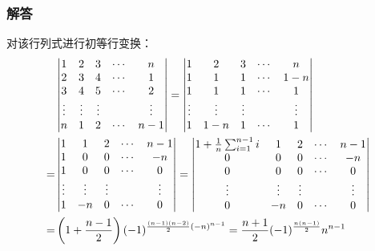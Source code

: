 \documentclass[10pt,xcolor=svgnames]{beamer} %
\begin{document}
\begin{frame}
    \frametitle{解答}
    对该行列式进行初等行变换：
    \begin{align*}
          &
        \begin{vmatrix}
            1      & 2      & 3      & \cdots & n      \\
            2      & 3      & 4      & \cdots & 1      \\
            3      & 4      & 5      & \cdots & 2      \\
            \vdots & \vdots & \vdots &        & \vdots \\
            n      & 1      & 2      & \cdots & n-1
        \end{vmatrix}=
        \begin{vmatrix}
            1      & 2      & 3      & \cdots & n      \\
            1      & 1      & 1      & \cdots & 1-n    \\
            1      & 1      & 1      & \cdots & 1      \\
            \vdots & \vdots & \vdots &        & \vdots \\
            1      & 1-n    & 1      & \cdots & 1
        \end{vmatrix}                                                                  \\
        = &
        \begin{vmatrix}
            1      & 1      & 2      & \cdots & n-1    \\
            1      & 0      & 0      & \cdots & -n     \\
            1      & 0      & 0      & \cdots & 0      \\
            \vdots & \vdots & \vdots &        & \vdots \\
            1      & -n     & 0      & \cdots & 0
        \end{vmatrix}=
        \begin{vmatrix}
            1+\frac{1}{n}\sum_{i=1}^{n-1}i & 1      & 2      & \cdots & n-1    \\
            0                              & 0      & 0      & \cdots & -n     \\
            0                              & 0      & 0      & \cdots & 0      \\
            \vdots                         & \vdots & \vdots &        & \vdots \\
            0                              & -n     & 0      & \cdots & 0
        \end{vmatrix}                                          \\
        = & \left( 1+\frac{n-1}{2} \right)(-1)^{\frac{(n-1)(n-2)}{2}(-n)^{n-1}}=\frac{n+1}{2}(-1)^{\frac{n(n-1)}{2}}n^{n-1}
    \end{align*}
\end{frame}
\end{document}
